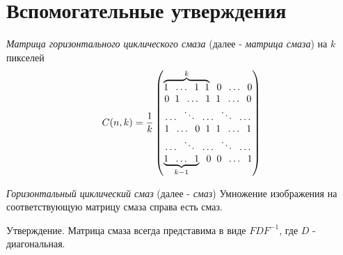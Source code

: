 \documentclass[10pt]{beamer}
\begin{document}
\section{Вспомогательные утверждения}
\begin{frame}
\begin{block}{\emph{Матрица горизонтального циклического смаза} (далее - \emph{матрица смаза}) на $k$ пикселей}
    $$
    C(n, k) = \frac{1}{k}\begin{pmatrix}
          \overbrace{1 \hspace*{2mm} \ldots \hspace*{2mm} 1 \hspace*{2mm} 1}^{k} \hspace*{2mm} 0 \hspace*{2mm} \ldots \hspace*{2mm} 0 \\
          0 \hspace*{2mm} 1 \hspace*{2mm} \ldots \hspace*{2mm} 1 \hspace*{2mm} 1 \hspace*{2mm} \ldots \hspace*{2mm} 0 \\
          \ldots \hspace*{2mm} \ddots \hspace*{2mm} \ldots \hspace*{2mm} \ddots \hspace*{2mm} \ldots \\
          1 \hspace*{2mm} \ldots \hspace*{2mm} 0 \hspace*{2mm} 1 \hspace*{2mm} 1 \hspace*{2mm} \ldots \hspace*{2mm} 1 \\
          \ldots \hspace*{2mm} \ddots \hspace*{2mm} \ldots \hspace*{2mm} \ddots \hspace*{2mm} \ldots\\
          \underbrace{1 \hspace*{2mm} \ldots \hspace*{2mm} 1}_{k-1} \hspace*{2mm} 0 \hspace*{2mm} 0 \hspace*{2mm} \ldots \hspace*{2mm} 1
        \end{pmatrix}
    $$
\end{block}
\begin{block}{\emph{Горизонтальный циклический смаз} (далее - \emph{смаз})}
Умножение изображения на соответствующую матрицу смаза справа есть смаз.
\end{block}
\begin{block}{Утверждение.}
 Матрица смаза всегда представима в виде $FDF^{-1}$, где $D$ - диагональная.
\end{block}

\end{frame}
\end{document}
